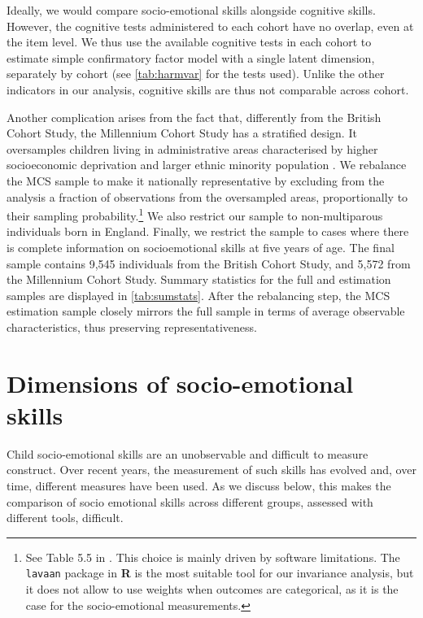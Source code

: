 Ideally, we would compare socio-emotional skills alongside cognitive skills. However, the cognitive tests administered to each cohort have no overlap, even at the item level. We thus use the available cognitive tests in each cohort to estimate simple confirmatory factor model with a single latent dimension, separately by cohort (see \autoref{tab:harmvar} for the tests used). Unlike the other indicators in our analysis, cognitive skills are thus not comparable across cohort. 

Another complication arises from the fact that, differently from the British Cohort Study, the Millennium Cohort Study has a stratified design. It oversamples children living in administrative areas characterised by higher socioeconomic deprivation and larger ethnic minority population \citep{Plewis2007}. We rebalance the MCS sample to make it nationally representative by excluding from the analysis a fraction of observations from the oversampled areas, proportionally to their sampling probability.\footnote{See Table 5.5 in \citet{Plewis2007}. This choice is mainly driven by software limitations. The \texttt{lavaan} package in \textbf{\textsf{R}} \citep{Rosseel2012} is the most suitable tool for our invariance analysis, but it does not allow to use weights when outcomes are categorical, as it is the case for the socio-emotional measurements.}
We also restrict our sample to non-multiparous individuals born in England. Finally, we restrict the sample to cases where there is complete information on socioemotional skills at five years of age. The final sample contains 9,545 individuals from the British Cohort Study, and 5,572 from the Millennium Cohort Study. Summary statistics for the full and estimation samples are displayed in \autoref{tab:sumstats}. After the rebalancing step, the MCS estimation sample closely mirrors the full sample in terms of average observable characteristics, thus preserving representativeness.

\section{Dimensions of  socio-emotional skills \label{sec:methods}}

Child socio-emotional skills are an unobservable and difficult to measure construct. Over recent years, the measurement of such skills has evolved and, over time, different measures have been used.  As we discuss below, this makes the comparison  of socio emotional skills across different groups, assessed with different tools, difficult.

